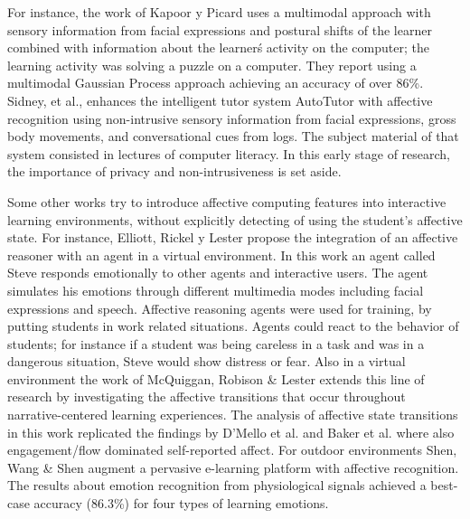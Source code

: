 \documentclass[a4paper,twoside]{article}
\begin{document}
For instance, the work of Kapoor y Picard \cite{kapoor2005multimodal}
uses a multimodal 
approach with sensory information from facial expressions and postural shifts
of the learner combined with information about the learner\'s activity on the
computer; the learning activity was solving a puzzle on a computer. They report
using a multimodal Gaussian Process approach achieving an accuracy of over 86\%.
Sidney, et al., \cite{sidney2005integrating} enhances the intelligent tutor system AutoTutor with
affective recognition using non-intrusive sensory information from facial
expressions, gross body movements, and conversational cues from logs.  The
subject material of that system consisted in lectures of computer
literacy. In this early stage of research, the importance of privacy
and non-intrusiveness is set aside. 

Some other works try to introduce affective computing features into
interactive learning environments, without explicitly detecting of
using the student's affective state. For instance, Elliott, Rickel y Lester \cite{elliott1999lifelike,d2008autotutor}
propose the integration of an affective reasoner 
with an agent in a virtual environment. In this work an agent called Steve
responds emotionally to other agents and interactive users. The agent simulates
his emotions through different multimedia modes including facial expressions and
speech. Affective reasoning agents were used for training, by putting students
in work related situations. Agents could react to the behavior of students; for
instance if a student was being careless in a task and was in a dangerous
situation, Steve would show distress or fear. Also in a virtual environment the
work of McQuiggan, Robison \& Lester \cite{mcquiggan2010affective} extends this line of research by
investigating the affective transitions that occur throughout narrative-centered
learning experiences. The analysis of affective state transitions in this work
replicated the findings by D’Mello et al. \cite{d2008autotutor} and Baker et al.
\cite{rodrigo2009affective} where
also engagement/flow dominated self-reported affect. For outdoor environments
Shen, Wang \& Shen \cite{shen2009affective} augment a pervasive e-learning platform with affective
recognition.  The results about emotion recognition from physiological signals
achieved a best-case accuracy (86.3\%) for four types of learning emotions.
\end{document}
